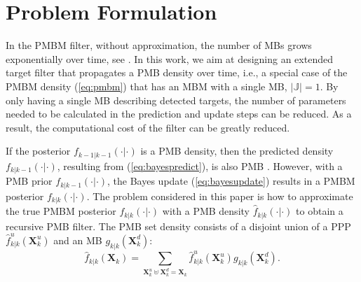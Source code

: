 \documentclass[journal]{IEEEtran}
\begin{document}

\section{Problem Formulation}
In the PMBM filter, without approximation, the number of MBs grows exponentially over time, see \cite{pmbmpoint,pmbmpoint2}. In this work, we aim at designing an extended target filter that propagates a PMB density over time, i.e., a special case of the PMBM density (\ref{eq:pmbm}) that has an MBM with a single MB, $|\mathbb{J}|=1$. By only having a single MB describing detected targets, the number of parameters needed to be calculated in the prediction and update steps can be reduced. As a result, the computational cost of the filter can be greatly reduced.  

If the posterior $f_{k-1|k-1}(\cdot|\cdot)$ is a PMB density, then the predicted density $f_{k|k-1}(\cdot|\cdot)$, resulting from (\ref{eq:bayespredict}), is also PMB \cite{pmbmpoint}. However, with a PMB prior $f_{k|k-1}(\cdot|\cdot)$, the Bayes update (\ref{eq:bayesupdate}) results in a PMBM posterior $f_{k|k}(\cdot|\cdot)$. The problem considered in this paper is how to approximate the true PMBM posterior $f_{k|k}(\cdot|\cdot)$ with a PMB density $\hat{f}_{k|k}(\cdot|\cdot)$ to obtain a recursive PMB filter. The PMB set density consists of a disjoint union of a PPP $\hat{f}_{k|k}^u(\mathbf{X}_k^u)$ and an MB $g_{k|k}(\mathbf{X}_k^d)$:
\begin{equation}
    \hat{f}_{k|k}(\mathbf{X}_k) = \sum_{\mathbf{X}_k^u\uplus\mathbf{X}_k^d=\mathbf{X}_k}\hat{f}_{k|k}^u(\mathbf{X}_k^u)g_{k|k}(\mathbf{X}_k^d).
    \label{eq:pmb}
\end{equation}


\end{document}

